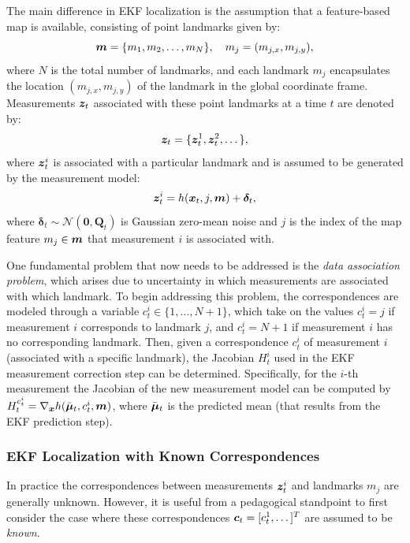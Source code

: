 The main difference in EKF localization is the assumption that a feature-based map is available, consisting of point landmarks given by:
\begin{equation*}
\bm{m} = \{m_1, m_2, \dots, m_N\}, \quad m_j = (m_{j,x}, m_{j,y}),
\end{equation*}
where $N$ is the total number of landmarks, and each landmark $m_j$ encapsulates the location $(m_{j,x}, m_{j,y})$ of the landmark in the global coordinate frame. Measurements $\bm{z}_t$ associated with these point landmarks at a time $t$ are denoted by:
\begin{equation*}
\bm{z}_t = \{\bm{z}_t^1, \bm{z}_t^2, \dots \},
\end{equation*}
where $\bm{z}_t^i$ is associated with a particular landmark and is assumed to be generated by the measurement model:
\begin{equation*}
\bm{z}^i_t = h(\bm{x}_t, j, \bm{m}) + \bm{\delta}_t,
\end{equation*}
where $\bm{\delta}_t \sim \mathcal{N}(\bm{0}, \bm{Q}_t)$ is Gaussian zero-mean noise and $j$ is the index of the map feature $m_j \in \bm{m}$ that measurement $i$ is associated with.

One fundamental problem that now needs to be addressed is the \textit{data association problem}, which arises due to uncertainty in which measurements are associated with which landmark. To begin addressing this problem, the correspondences are modeled through a variable $c_t^i \in \{1,\dots,N+1\}$, which take on the values $c_t^i = j$ if measurement $i$ corresponds to landmark $j$, and $c_t^i = N + 1$ if measurement $i$ has no corresponding landmark. 
Then, given a correspondence $c^i_t$ of measurement $i$ (associated with a specific landmark), the Jacobian $H^i_t$ used in the EKF measurement correction step can be determined. Specifically, for the $i$-th measurement the Jacobian of the new measurement model can be computed by $H^{c^i_t}_t = \nabla_{\bm{x}}h(\bar{\bm{\mu}}_t,c^i_t,\bm{m})$, where $\bar{\bm{\mu}}_t$ is the predicted mean (that results from the EKF prediction step).


\subsubsection{EKF Localization with Known Correspondences}
In practice the correspondences between measurements $\bm{z}^i_t$ and landmarks $m_j$ are generally unknown. However, it is useful from a pedagogical standpoint to first consider the case where these correspondences $\bm{c}_t = [c_t^1,\dots]^T$ are assumed to be \textit{known}.

